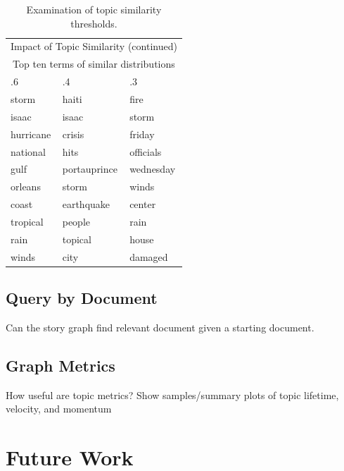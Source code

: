\documentclass[10pt,twocolumn]{article}
\begin{document}
\begin{table}
\begin{center}
\begin{tabular}{|l|l|l|}
  \hline
  \multicolumn{3}{|c|}{Impact of Topic Similarity (continued)} \\
  \multicolumn{3}{|c|}{Top ten terms of similar distributions} \\
  \hline
.6 & .4 & .3 \\
\hline
storm & haiti & fire\\
isaac & isaac & storm\\
hurricane & crisis & friday\\
national & hits & officials \\
gulf & portauprince & wednesday\\
orleans & storm & winds\\
coast & earthquake & center\\
tropical & people & rain\\
rain & topical & house \\
winds & city & damaged\\
  \hline
\end{tabular}
\caption*{Examination of topic similarity thresholds.}
\end{center}
\end{table}



\subsection {Query by Document}
Can the story graph find relevant document given a starting document.

\subsection {Graph Metrics}
How useful are topic metrics? Show samples/summary plots of topic lifetime, velocity, and momentum

\section {Future Work}
\end{document}
